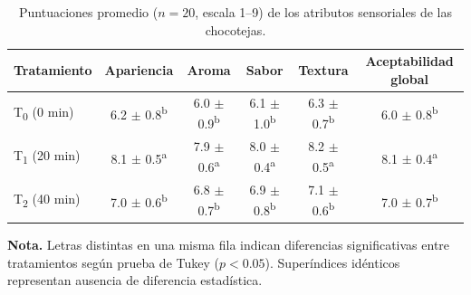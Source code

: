 \documentclass[manuscript,screen,review]{acmart}
\begin{document}
\begin{table}[H]
  \centering
  \caption{Puntuaciones promedio ($n=20$, escala 1--9) de los atributos sensoriales de las chocotejas.}
  \label{tab:sensorial}
  \begin{tabular}{lccccc}
    \toprule
    \textbf{Tratamiento} & \textbf{Apariencia} & \textbf{Aroma} & \textbf{Sabor} & \textbf{Textura} & \textbf{Aceptabilidad global} \\
    \midrule
    T\textsubscript{0} (0 min)  & 6.2 $\pm$ 0.8\textsuperscript{b} & 6.0 $\pm$ 0.9\textsuperscript{b} & 6.1 $\pm$ 1.0\textsuperscript{b} & 6.3 $\pm$ 0.7\textsuperscript{b} & 6.0 $\pm$ 0.8\textsuperscript{b} \\
    T\textsubscript{1} (20 min) & 8.1 $\pm$ 0.5\textsuperscript{a} & 7.9 $\pm$ 0.6\textsuperscript{a} & 8.0 $\pm$ 0.4\textsuperscript{a} & 8.2 $\pm$ 0.5\textsuperscript{a} & 8.1 $\pm$ 0.4\textsuperscript{a} \\
    T\textsubscript{2} (40 min) & 7.0 $\pm$ 0.6\textsuperscript{b} & 6.8 $\pm$ 0.7\textsuperscript{b} & 6.9 $\pm$ 0.8\textsuperscript{b} & 7.1 $\pm$ 0.6\textsuperscript{b} & 7.0 $\pm$ 0.7\textsuperscript{b} \\
    \bottomrule
  \end{tabular}
  \begin{minipage}{0.9\linewidth}
  \footnotesize
  \textbf{Nota.} Letras distintas en una misma fila indican diferencias significativas entre tratamientos según prueba de Tukey ($p<0.05$). Superíndices idénticos representan ausencia de diferencia estadística.
  \end{minipage}
\end{table}
\end{document}
